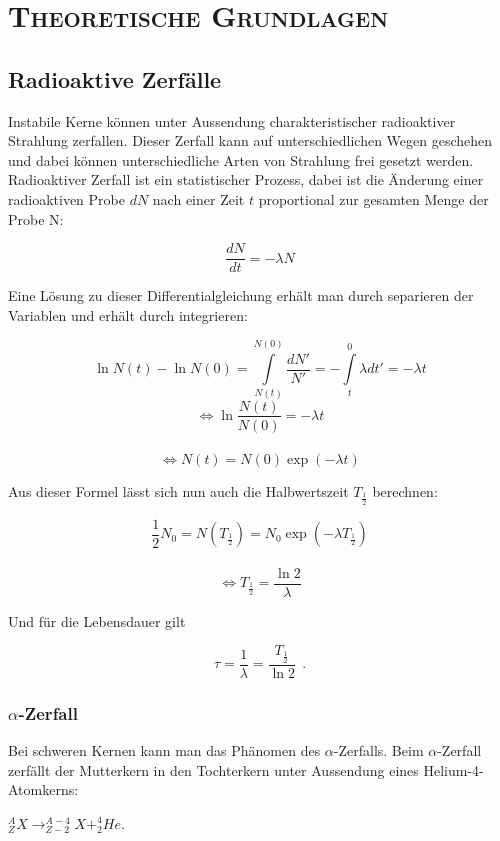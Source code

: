 \clearpage
\section{\textsc{Theoretische Grundlagen}}
\subsection{Radioaktive Zerfälle}
Instabile Kerne können unter Aussendung charakteristischer radioaktiver Strahlung zerfallen. Dieser Zerfall kann auf unterschiedlichen Wegen geschehen und dabei können unterschiedliche Arten von Strahlung frei gesetzt werden. Radioaktiver Zerfall ist ein statistischer Prozess, dabei ist die Änderung einer radioaktiven Probe $dN$ nach einer Zeit $t$ proportional zur gesamten Menge der Probe N:
\begin{center}
\[\frac{dN}{dt}=-\lambda N \]
\end{center}
Eine Lösung zu dieser Differentialgleichung erhält man durch separieren der Variablen und erhält durch integrieren:
\begin{center}
\[\ln N(t)-\ln N(0)= \int\limits_{N(t)}^{N(0)}\frac{dN'}{N'}=- \int\limits_{t}^{0}\lambda dt'= -\lambda t \]
\[ \Leftrightarrow \ln{\frac{N(t)}{N(0)}} = -\lambda t\]\\
\[ \Leftrightarrow N(t)= N(0) \exp(-\lambda t)\]
\end{center}
Aus dieser Formel lässt sich nun auch die Halbwertszeit $T_{\frac{1}{2}}$ berechnen:
\begin{center}
\[ \frac{1}{2}N_0 = N(T_{\frac{1}{2}}) = N_0 \exp(-\lambda T_{\frac{1}{2}})\]\\
\[ \Leftrightarrow T_{\frac{1}{2}} = \frac{\ln 2}{\lambda}\]
\end{center}
Und für die Lebensdauer gilt
\begin{center}
\[ \tau = \frac{1}{\lambda}= \frac{T_{\frac{1}{2}}}{\ln 2}~~. \]
\end{center}
\subsubsection{$\alpha$-Zerfall}
Bei schweren Kernen kann man das Phänomen des  $\alpha$-Zerfalls. Beim $\alpha$-Zerfall zerfällt der Mutterkern in den Tochterkern unter Aussendung eines Helium-4-Atomkerns:
\begin{center}
$_Z^AX \rightarrow _{Z-2}^{A-4}X+_2^4He$.
\end{center}
